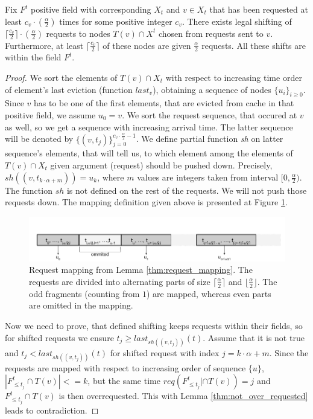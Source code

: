 \begin{lemma}
Fix $F^t$ positive field with corresponding $X_t$ and $v \in X_t$ that has 
been requested at least $c_v \cdot (\frac{\alpha}{2})$ times for some positive 
integer $c_v$. There exists legal shifting of $\lceil \frac{c_v}{2} 
\rceil \cdot (\frac{\alpha}{2})$ requests to nodes 
$T(v) \cap X^t$ chosen from requests sent to $v$. Furthermore, at least $\lceil 
\frac{c_v}{2} \rceil$ of these nodes are given $\frac{\alpha}{2}$ requests. All 
these shifts are within the field $F^t$.
\label{thm:request_mapping}
\end{lemma}
\begin{proof}
We sort the elements of $T(v) \cap X_t$ with respect to increasing time order 
of element's last eviction (function $last_v$), obtaining a sequence of nodes 
$\{u_i\}_{i \geq 0}$. Since $v$ has to be one of the first elements, that are 
evicted from cache in that positive field, we assume $u_0 = v$. We sort the 
request sequence, that occured at $v$ as well, so we get a sequence with 
increasing arrival time. The latter sequence will be denoted by 
$\{(v, t_j)\}_{j=0}^{c_v \cdot \frac{\alpha}{2} - 1}$. We define partial 
function \textit{sh} on latter sequence's elements, that will tell us, to which 
element among the elements of  $T(v) \cap X_t$ given argument (request) should 
be pushed down. Precisely, $sh((v, t_{k \cdot \alpha + m})) = u_k$, where $m$ 
values are integers taken from interval $[0, \frac{\alpha}{2})$. The function 
$sh$ is not defined on the rest of the requests. We will not push those 
requests down. The mapping definition given above is presented at Figure 
\ref{fig:req_map}.
\begin{figure}
 \begin{center}
  \includegraphics[width=1.1\textwidth]{request_mapping.png}
 \end{center}
 \caption{Request mapping from Lemma \ref{thm:request_mapping}. The requests 
are divided into alternating parts of size $\lceil \frac{\alpha}{2} \rceil$ 
and $\lfloor \frac{\alpha}{2} \rfloor$. The odd fragments (counting from $1$) 
are mapped, whereas even parts are omitted in the mapping.}
 \label{fig:req_map}
\end{figure}

Now we need to prove, that defined shifting keeps requests within their fields, 
so for shifted requests we ensure $t_j \geq last_{sh((v, t_j))}(t)$. Assume 
that it is not true and 
$t_j < last_{sh((v, t_j))}(t)$ for shifted request with index 
$j = k \cdot \alpha + m$. Since the requests are mapped with respect to 
increasing order of sequence $\{u\}$, $|F^t_{\leq t_j} \cap T(v)| <= k$, but 
the same time $req(F^t_{\leq t_j}| \cap T(v)) = j$ and $F^t_{\leq t_j} \cap 
T(v)$ is then overrequested. This with Lemma \ref{thm:not_over_requested} leads 
to contradiction.
\end{proof}
